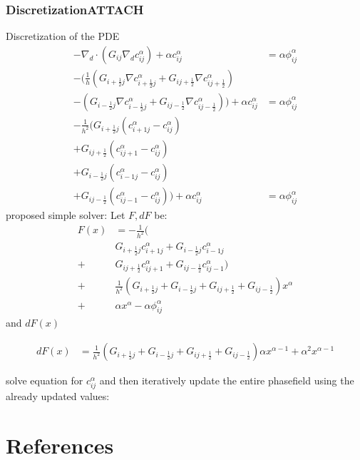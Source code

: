 \documentclass[11pt]{article}
\begin{document}
\subsubsection{Discretization\hfill{}\textsc{ATTACH}}
\label{sec:org84934ed}
Discretization of the PDE
\begin{align*}
- \nabla_d \cdot  (G_{ij} \nabla_d c_{ij}^\alpha) + \alpha  c_{ij}^\alpha &= \alpha \phi_{ij}^\alpha \\
- (\frac{1}{h}(G_{i+\frac{1}{2}j} \nabla c^\alpha_{i+\frac{1}{2}j} + G_{ij+\frac{1}{2}} \nabla c^\alpha_{ij+\frac{1}{2}}) &  \\
- (G_{i-\frac{1}{2}j} \nabla c^\alpha_{i-\frac{1}{2}j} + G_{ij-\frac{1}{2}} \nabla c^\alpha_{ij-\frac{1}{2}})) + \alpha  c_{ij}^\alpha   &= \alpha  \phi_{ij}^\alpha \\
- \frac{1}{h^2} ( G_{i+\frac{1}{2}j}(c_{i+1j}^\alpha - c_{ij}^\alpha) & \\
+G_{ij+\frac{1}{2}}(c_{ij+1}^\alpha - c_{ij}^\alpha) & \\
+G_{i-\frac{1}{2}j}(c_{i-1j}^\alpha - c_{ij}^\alpha)& \\
+G_{ij-\frac{1}{2}}(c_{ij-1}^\alpha - c_{ij}^\alpha)) + \alpha  c_{ij}^\alpha &=\alpha  \phi_{ij}^\alpha
\end{align*}
proposed simple solver:
Let \(F, dF\) be:
\begin{align*}
F(x) &= - \frac{1}{h^2}(\\
 & G_{i+\frac{1}{2}j} c_{i+1j}^\alpha  +G_{i-\frac{1}{2}j} c_{i-1j}^\alpha \\
 +&G_{ij+\frac{1}{2}} c_{ij+1}^\alpha  + G_{ij-\frac{1}{2}}c_{ij-1}^\alpha) \\
+& \frac{1}{h^2} (G_{i+\frac{1}{2}j} +G_{i-\frac{1}{2}j}+ G_{ij+\frac{1}{2}}+  G_{ij-\frac{1}{2}}) x^\alpha \\
+& \alpha x^\alpha  - \alpha \phi_{ij}^\alpha
\end{align*}
and \(dF(x)\)

\begin{align*}
dF(x) &= \frac{1}{h^2} (G_{i+\frac{1}{2}j} +G_{i-\frac{1}{2}j}+ G_{ij+\frac{1}{2}}+  G_{ij-\frac{1}{2}}  ) \alpha x^{\alpha -1}  + \alpha ^2 x^{\alpha -1}
\end{align*}


solve equation for \(c_{ij}^\alpha\) and then iteratively update the entire phasefield using the already updated values:
\section{References}
\label{sec:org5f1f6d2}
\printbibliography
\end{document}
